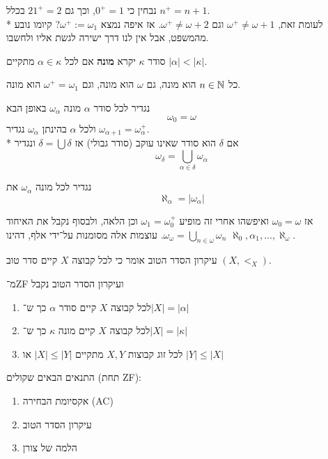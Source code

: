 \begin{example}
	נבחין כי $0^+ = 1$, וכך גם $21^+ = 2$ בכלל $n^+ = n + 1$. \\*
	לעומת זאת, $\omega^+ \ne \omega + 1$ וגם $\omega^+ \ne \omega + 2$.
	אז איפה נמצא $\omega^+ := \omega_1$?
	קיומו נובע מהמשפט, אבל אין לנו דרך ישירה לגשת אליו ולחשבו.
\end{example}
\begin{definition}[מונה]
	סודר $\kappa$ יקרא \textbf{מונה} אם לכל $\alpha \in \kappa$ מתקיים $|\alpha| < |\kappa|$.
\end{definition}
\begin{example}
	כל $n \in \mathbb{N}$ הוא מונה, גם $\omega$ הוא מונה, וגם $\omega^+ = \omega_1$ הוא מונה.
\end{example}
\begin{definition}
	נגדיר לכל סודר $\alpha$ מונה $\omega_\alpha$ באופן הבא
	\[
		\omega_0 = \omega
	\]
	ולכל $\alpha$ בהינתן $\omega_\alpha$ נגדיר $\omega_{\alpha + 1} = \omega_\alpha^+$. \\*
	אם $\delta$ הוא סודר שאינו עוקב (סודר גבולי) אז $\delta = \bigcup \delta$ ונגדיר
	\[
		\omega_\delta = \bigcup_{\alpha \in \delta} \omega_\alpha
	\]
\end{definition}
\begin{definition}
	נגדיר לכל מונה $\omega_\alpha$ את
	\[
		\aleph_\alpha = |\omega_\alpha|
	\]
\end{definition}
אז $\omega_0 = \omega$ ואיפשהו אחרי זה מופיע $\omega_1 = \omega_0^+$ וכן הלאה, ולבסוף נקבל את האיחוד $\omega_\omega = \bigcup_{n \in \omega} \omega_n$.
עוצמות אלה מסומנות על־ידי אלף, דהינו $\aleph_0, \alpha_1, \dots, \aleph_\omega$.
\begin{definition}
	עיקרון הסדר הטוב אומר כי לכל קבוצה $X$ קיים סדר טוב $(X, <_X)$.
\end{definition}
\begin{conclusion}
	מ־ZF ועיקרון הסדר הטוב נקבל
	\begin{enumerate}
		\item לכל קבוצה $X$ קיים סודר $\alpha$ כך ש־$|X| = |\alpha|$
		\item לכל קבוצה $X$ קיים מונה $\kappa$ כך ש־$|X| = |\kappa|$
		\item לכל זוג קבוצות $X, Y$ מתקיים $|X| \le |Y|$ או $|Y| \le |X|$
	\end{enumerate}
\end{conclusion}
\begin{theorem}
	התנאים הבאים שקולים (תחת ZF):
	\begin{enumerate}
		\item אקסיומת הבחירה (AC)
		\item עיקרון הסדר הטוב
		\item הלמה של צורן
	\end{enumerate}
\end{theorem}


